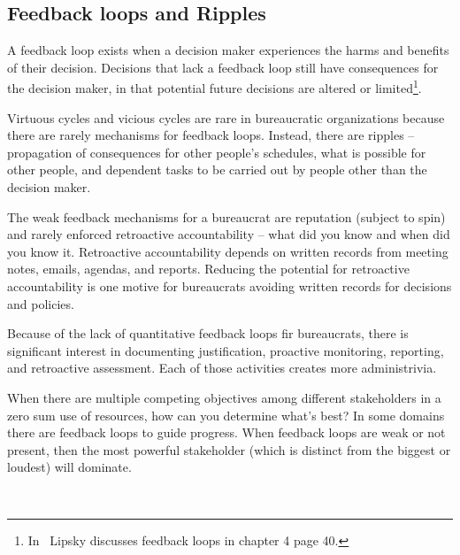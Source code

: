\subsection*{Feedback loops and Ripples\label{sec:feedback-loop-and-ripples}}



A feedback loop exists when a decision maker experiences the harms and benefits of their decision. Decisions that lack a feedback loop still have consequences for the decision maker, in that potential future decisions are altered or limited\footnote{In~\cite{1983_Lipsky} Lipsky discusses feedback loops in chapter 4 page 40.}.


Virtuous cycles and vicious cycles are rare in bureaucratic organizations because there are rarely mechanisms for feedback loops. Instead, there are \glspl{ripple} -- propagation of consequences for other people's schedules, what is possible for other people, and dependent tasks to be carried out by people other than the decision maker.


The weak feedback mechanisms for a bureaucrat are reputation (subject to spin) and rarely enforced retroactive accountability -- what did you know and when did you know it.
Retroactive accountability depends on written records from meeting notes, emails, agendas, and reports. Reducing the potential for retroactive accountability is one motive for bureaucrats avoiding written records for decisions and policies.


Because of the lack of quantitative feedback loops fir bureaucrats, there is significant interest in documenting justification, proactive monitoring, reporting, and retroactive assessment. Each of those activities creates more administrivia.


When there are multiple competing objectives among different stakeholders in a zero sum use of resources, how can you determine what's best? In some domains there are feedback loops to guide progress. When feedback loops are weak or not present, then the most powerful stakeholder (which is distinct from the biggest or loudest) will dominate. 


\ \\



